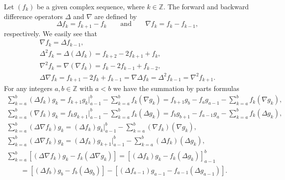Let $(f_{k})$ be a given complex sequence, where $k\in
\mathbb{Z}.$ The forward and backward dif\/ference operators $\Delta $ and $\nabla $ are
def\/ined by%
\[
\Delta f_{k}=f_{k+1}-f_{k}\qquad \text{and} \qquad \nabla f_{k}=f_{k}-f_{k-1},
\]%
respectively. We easily see that%
\begin{gather*}
\nabla f_{k}=\Delta f_{k-1},
\\
\Delta ^{2}f_{k}=\Delta (\Delta f_{k})=f_{k+2}-2f_{k+1}+f_{k},
\\
\nabla ^{2}f_{k}=\nabla (\nabla f_{k})=f_{k}-2f_{k-1}+f_{k-2},
\\
\Delta \nabla f_{k}=f_{k+1}-2f_{k}+f_{k-1}=\nabla \Delta f_{k}=\Delta
^{2}f_{k-1}=\nabla ^{2}f_{k+1}.
\end{gather*}
For any integers $a,b\in
\mathbb{Z}
$ with $a<b$ we have the summation by parts formulas%
\begin{gather}
\sum_{k=a}^{b}(\Delta f_{k})g_{k}=f_{k+1}g_{k}\big|_{a-1}^{b}-\sum_{k=a}^{b}f_{k}(\nabla
g_{k})=f_{b+1}g_{b}-f_{a}g_{a-1}-\sum_{k=a}^{b}f_{k}(\nabla g_{k}),
\nonumber\\
\sum_{k=a}^{b}(\nabla f_{k})g_{k}=f_{k}g_{k+1}\big|_{a-1}^{b}-\sum_{k=a}^{b}f_{k}(\Delta
g_{k})=f_{b}g_{b+1}-f_{a-1}g_{a}-\sum_{k=a}^{b}f_{k}(\Delta g_{k}),
\label{3.1}
\\
\sum_{k=a}^{b}(\Delta \nabla f_{k})g_{k}=(\Delta f_{k})g_{k}\big|_{a-1}^{b}-\sum_{k=a}^{b}(\nabla f_{k})(\nabla g_{k}),  \label{3.2}
\\
\sum_{k=a}^{b}(\Delta \nabla f_{k})g_{k}=(\Delta f_{k})g_{k+1}\big|_{a-1}^{b}-\sum_{k=a}^{b}(\Delta f_{k})(\Delta g_{k}),  \nonumber %
\\
\sum_{k=a}^{b}[(\Delta \nabla f_{k})g_{k}-f_{k}(\Delta \nabla
g_{k})]=[(\Delta f_{k})g_{k}-f_{k}(\Delta g_{k})]_{a-1}^{b}
\nonumber\\
\qquad{}
=[(\Delta f_{b})g_{b}-f_{b}(\Delta g_{b})]-[(\Delta
f_{a-1})g_{a-1}-f_{a-1}(\Delta g_{a-1})].  \label{3.4}
\end{gather}
